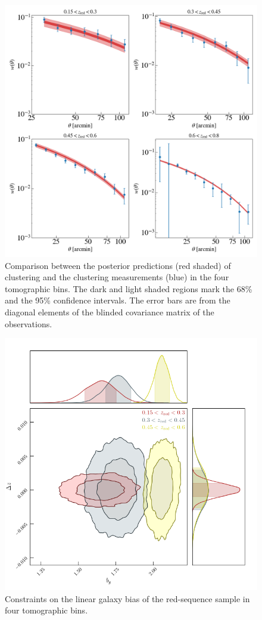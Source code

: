 \documentclass[fleqn,usenatbib,useAMS]{mnras}
\begin{document}
\begin{figure}
\includegraphics[width=\textwidth]{figures_tmp/w_estimate.png}
\caption{\label{fig:w_estimate} Comparison between the posterior predictions (red shaded) of clustering and the clustering measurements (blue) in the four tomographic bins. The dark and light shaded regions mark the 68\% and the 95\% confidence intervals. The error bars are from the diagonal elements of the blinded covariance matrix of the observations.} 
\end{figure}


\begin{figure}
\includegraphics[width=\columnwidth]{figures_tmp/joint_estimate.png}
\caption{\label{fig:b_estimate} Constraints on the linear galaxy bias of the red-sequence sample in four tomographic bins.} 
\end{figure}
\end{document}
